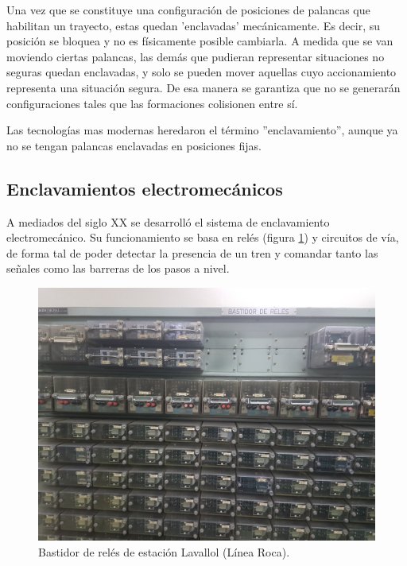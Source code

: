 			Una vez que se constituye una configuración de posiciones de palancas que habilitan un trayecto, estas quedan 'enclavadas' mecánicamente. Es decir, su posición se bloquea y no es físicamente posible cambiarla. A medida que se van moviendo ciertas palancas, las demás que pudieran representar situaciones no seguras quedan enclavadas, y solo se pueden mover aquellas cuyo accionamiento representa una situación segura. De esa manera se garantiza que no se generarán configuraciones tales que las formaciones colisionen entre sí.
			
			Las tecnologías mas modernas heredaron el término ''enclavamiento'', aunque ya no se tengan palancas enclavadas en posiciones fijas.
		
		\subsection{Enclavamientos electromecánicos}
			
			A mediados del siglo XX se desarrolló el sistema de enclavamiento electromecánico. Su funcionamiento se basa en relés (figura \ref{fig:Reles}) y circuitos de vía, de forma tal de poder detectar la presencia de un tren y comandar tanto las señales como las barreras de los pasos a nivel.
	
			
			\begin{figure}[htbp!]
				\centering
				\includegraphics[scale=.08]{./Figures/Reles}
				\caption{Bastidor de relés de estación Lavallol (Línea Roca).}
				\label{fig:Reles}
			\end{figure}
		
